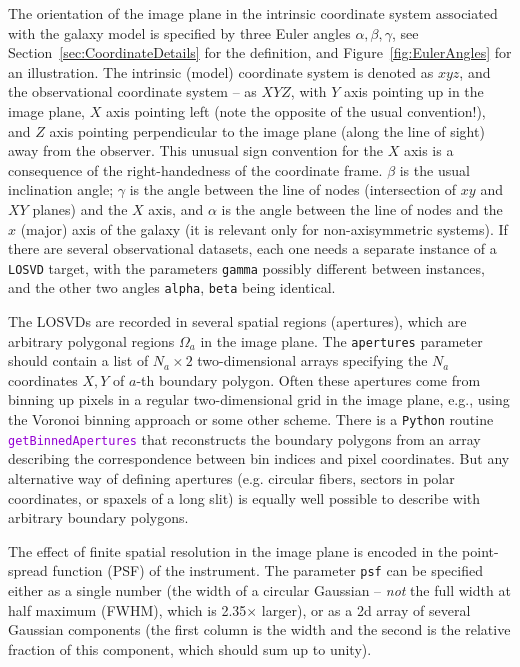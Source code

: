 \documentclass[12pt]{article}
\newcommand{\Python}{\texttt{Python}\xspace}
\newcommand{\ttt}[1]{\textcolor{darkviolet}{\texttt{#1}}}
\newcommand{\ppp}[1]{\textcolor{darkolive} {\texttt{#1}}}
\begin{document}
The orientation of the image plane in the intrinsic coordinate system associated with the galaxy model is specified by three Euler angles $\alpha,\beta,\gamma$, see Section~\ref{sec:CoordinateDetails} for the definition, and Figure~\ref{fig:EulerAngles} for an illustration. The intrinsic (model) coordinate system is denoted as $xyz$, and the observational coordinate system -- as $XYZ$, with $Y$ axis pointing up in the image plane, $X$ axis pointing left (note the opposite of the usual convention!), and $Z$ axis pointing perpendicular to the image plane (along the line of sight) away from the observer. This unusual sign convention for the $X$ axis is a consequence of the right-handedness of the coordinate frame. $\beta$ is the usual inclination angle; $\gamma$ is the angle between the line of nodes (intersection of $xy$ and $XY$ planes) and the $X$ axis, and $\alpha$ is the angle between the line of nodes and the $x$ (major) axis of the galaxy (it is relevant only for non-axisymmetric systems). If there are several observational datasets, each one needs a separate instance of a \ppp{LOSVD} target, with the parameters \ppp{gamma} possibly different between instances, and the other two angles \ppp{alpha}, \ppp{beta} being identical.

The LOSVDs are recorded in several spatial regions (apertures), which are arbitrary polygonal regions $\Omega_a$ in the image plane. The \ppp{apertures} parameter should contain a list of $N_a\times2$ two-dimensional arrays specifying the $N_a$ coordinates $X,Y$ of $a$-th boundary polygon. Often these apertures come from binning up pixels in a regular two-dimensional grid in the image plane, e.g., using the Voronoi binning approach \cite{CappellariCopin2003} or some other scheme. There is a \Python routine \ttt{getBinnedApertures} that reconstructs the boundary polygons from an array describing the correspondence between bin indices and pixel coordinates. But any alternative way of defining apertures (e.g. circular fibers, sectors in polar coordinates, or spaxels of a long slit) is equally well possible to describe with arbitrary boundary polygons.

The effect of finite spatial resolution in the image plane is encoded in the point-spread function (PSF) of the instrument. The parameter \ppp{psf} can be specified either as a single number (the width of a circular Gaussian -- \textit{not} the full width at half maximum (FWHM), which is 2.35$\times$ larger), or as a 2d array of several Gaussian components (the first column is the width and the second is the relative fraction of this component, which should sum up to unity).
\end{document}
